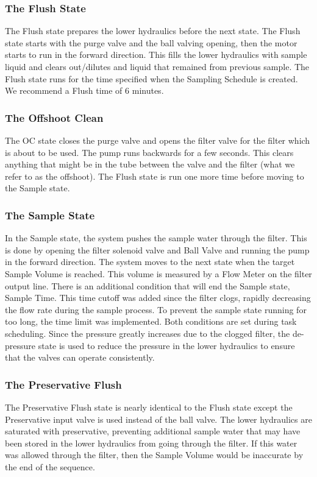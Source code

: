 \documentclass[11pt, letterpaper]{article}
\begin{document}
\subsubsection{The Flush State}
The Flush state prepares the lower hydraulics before the next state. The Flush state starts with the purge valve and the ball valving opening, then the motor starts to run in the forward direction. This fills the lower hydraulics with sample liquid and clears out/dilutes and liquid that remained from previous sample. The Flush state runs for the time specified when the Sampling Schedule is created. We recommend a Flush time of 6 minutes. 

\subsubsection{The Offshoot Clean}
The OC state closes the purge valve and opens the filter valve for the filter which is about to be used. The pump runs backwards for a few seconds. This clears anything that might be in the tube between the valve and the filter (what we refer to as the offshoot). The Flush state is run one more time before moving to the Sample state.

\subsubsection{The Sample State} 
In the Sample state, the system pushes the sample water through the filter. This is done by opening the filter solenoid valve and Ball Valve and running the pump in the forward direction. The system moves to the next state when the target Sample Volume is reached. This volume is measured by a Flow Meter on the filter output line. There is an additional condition that will end the Sample state, Sample Time. This time cutoff was added since the filter clogs, rapidly decreasing the flow rate during the sample process. To prevent the sample state running for too long, the time limit was implemented. Both conditions are set during task scheduling. Since the pressure greatly increases due to the clogged filter, the de-pressure state is used to reduce the pressure in the lower hydraulics to ensure that the valves can operate consistently.

\subsubsection{The Preservative Flush}
The Preservative Flush state is nearly identical to the Flush state except the Preservative input valve is used instead of the ball valve. The lower hydraulics are saturated with preservative, preventing additional sample water that may have been stored in the lower hydraulics from going through the filter. If this water was allowed through the filter, then the Sample Volume would be inaccurate by the end of the sequence.
\end{document}
